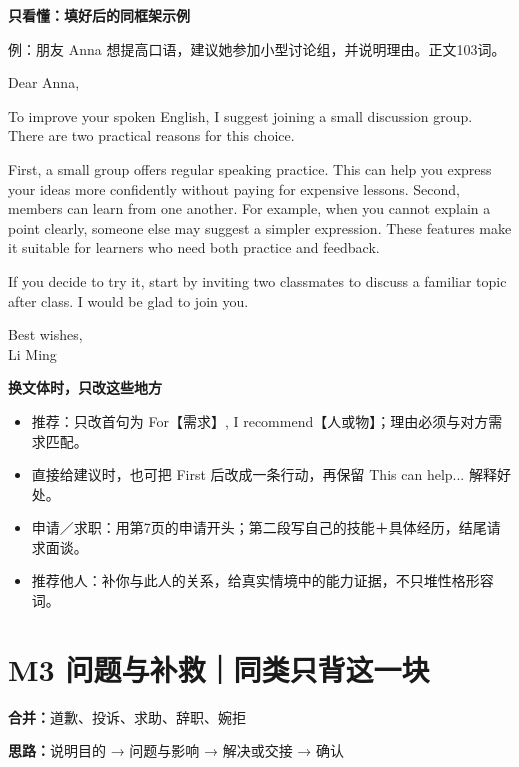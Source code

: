 \documentclass[11pt,a4paper,fontset=macnew]{ctexart}
\newenvironment{example}{\begingroup\fontsize{10.5}{14}\selectfont\setlength{\parskip}{4pt}}{\par\endgroup}
\begin{document}
\par\vspace{5pt}\noindent\textbf{只看懂：填好后的同框架示例}\par\nopagebreak
{\small 例：朋友 Anna 想提高口语，建议她参加小型讨论组，并说明理由。\quad 正文103词。}\par
\begin{example}
Dear Anna,\par
To improve your spoken English, I suggest joining a small discussion group. There are two practical reasons for this choice.

First, a small group offers regular speaking practice. This can help you express your ideas more confidently without paying for expensive lessons. Second, members can learn from one another. For example, when you cannot explain a point clearly, someone else may suggest a simpler expression. These features make it suitable for learners who need both practice and feedback.

If you decide to try it, start by inviting two classmates to discuss a familiar topic after class. I would be glad to join you.

Best wishes,\\Li Ming\par
\end{example}
\par\vspace{5pt}\noindent\textbf{换文体时，只改这些地方}\par\nopagebreak
{\small\begin{itemize}
\item 推荐：只改首句为 For【需求】, I recommend【人或物】；理由必须与对方需求匹配。
\item 直接给建议时，也可把 First 后改成一条行动，再保留 This can help... 解释好处。
\item 申请／求职：用第7页的申请开头；第二段写自己的技能＋具体经历，结尾请求面谈。
\item 推荐他人：补你与此人的关系，给真实情境中的能力证据，不只堆性格形容词。
\end{itemize}}
\clearpage\section*{M3 问题与补救｜同类只背这一块}
{\small\textbf{合并：}道歉、投诉、求助、辞职、婉拒\par\textbf{思路：}说明目的 → 问题与影响 → 解决或交接 → 确认}\par
\end{document}
